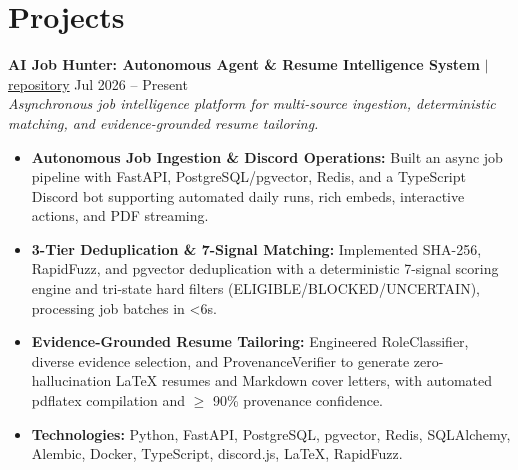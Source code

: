 \documentclass[10pt, letterpaper]{article}
\begin{document}
\section*{Projects}
\noindent \textbf{AI Job Hunter: Autonomous Agent \& Resume Intelligence System} $|$ \href{https://github.com}{repository} \hfill Jul 2026 -- Present\\
\textit{Asynchronous job intelligence platform for multi-source ingestion, deterministic matching, and evidence-grounded resume tailoring.}\\
\begin{itemize}[leftmargin=0.25in, nosep]
    \item \textbf{Autonomous Job Ingestion \& Discord Operations:} Built an async job pipeline with FastAPI, PostgreSQL/pgvector, Redis, and a TypeScript Discord bot supporting automated daily runs, rich embeds, interactive actions, and PDF streaming.

    \item \textbf{3-Tier Deduplication \& 7-Signal Matching:} Implemented SHA-256, RapidFuzz, and pgvector deduplication with a deterministic 7-signal scoring engine and tri-state hard filters (ELIGIBLE/BLOCKED/UNCERTAIN), processing job batches in <6s.

    \item \textbf{Evidence-Grounded Resume Tailoring:} Engineered RoleClassifier, diverse evidence selection, and ProvenanceVerifier to generate zero-hallucination LaTeX resumes and Markdown cover letters, with automated pdflatex compilation and $\ge$ 90\% provenance confidence.

    \item \textbf{Technologies:} Python, FastAPI, PostgreSQL, pgvector, Redis, SQLAlchemy, Alembic, Docker, TypeScript, discord.js, LaTeX, RapidFuzz.
\end{itemize}
\end{document}
